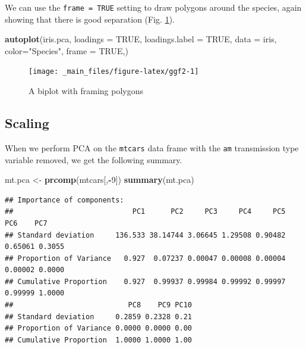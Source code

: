 \documentclass[
]{book}
\newenvironment{Shaded}{\begin{snugshade}}{\end{snugshade}}
\newcommand{\AttributeTok}[1]{\textcolor[rgb]{0.13,0.29,0.53}{#1}}
\newcommand{\ConstantTok}[1]{\textcolor[rgb]{0.56,0.35,0.01}{#1}}
\newcommand{\DecValTok}[1]{\textcolor[rgb]{0.00,0.00,0.81}{#1}}
\newcommand{\FunctionTok}[1]{\textcolor[rgb]{0.13,0.29,0.53}{\textbf{#1}}}
\newcommand{\NormalTok}[1]{#1}
\newcommand{\OtherTok}[1]{\textcolor[rgb]{0.56,0.35,0.01}{#1}}
\newcommand{\SpecialCharTok}[1]{\textcolor[rgb]{0.81,0.36,0.00}{\textbf{#1}}}
\newcommand{\StringTok}[1]{\textcolor[rgb]{0.31,0.60,0.02}{#1}}
\theoremstyle{definition}
\theoremstyle{definition}
\theoremstyle{definition}
\theoremstyle{definition}
\theoremstyle{remark}
\begin{document}
We can use the \texttt{frame\ =\ TRUE} setting to draw polygons around the species, again showing that there is good separation (Fig. \ref{fig:ggf2}).

\begin{Shaded}
\begin{Highlighting}[]
\FunctionTok{autoplot}\NormalTok{(iris.pca, }\AttributeTok{loadings =} \ConstantTok{TRUE}\NormalTok{,}
          \AttributeTok{loadings.label =} \ConstantTok{TRUE}\NormalTok{,}
          \AttributeTok{data =}\NormalTok{ iris,}
          \AttributeTok{color=}\StringTok{"Species"}\NormalTok{,}
          \AttributeTok{frame =} \ConstantTok{TRUE}\NormalTok{,)}
\end{Highlighting}
\end{Shaded}

\begin{figure}

{\centering \texttt{[image: \_main\_files/figure-latex/ggf2-1]} 

}

\caption{A biplot with framing polygons}\label{fig:ggf2}
\end{figure}

\subsection*{Scaling}\label{scaling}

When we perform PCA on the \texttt{mtcars} data frame with the \texttt{am} transmission type variable removed, we get the following summary.

\begin{Shaded}
\begin{Highlighting}[]
\NormalTok{mt.pca }\OtherTok{\textless{}{-}} \FunctionTok{prcomp}\NormalTok{(mtcars[,}\SpecialCharTok{{-}}\DecValTok{9}\NormalTok{])}
\FunctionTok{summary}\NormalTok{(mt.pca)}
\end{Highlighting}
\end{Shaded}

\begin{verbatim}
## Importance of components:
##                            PC1      PC2     PC3     PC4     PC5     PC6    PC7
## Standard deviation     136.533 38.14744 3.06645 1.29508 0.90482 0.65061 0.3055
## Proportion of Variance   0.927  0.07237 0.00047 0.00008 0.00004 0.00002 0.0000
## Cumulative Proportion    0.927  0.99937 0.99984 0.99992 0.99997 0.99999 1.0000
##                           PC8    PC9 PC10
## Standard deviation     0.2859 0.2328 0.21
## Proportion of Variance 0.0000 0.0000 0.00
## Cumulative Proportion  1.0000 1.0000 1.00
\end{verbatim}
\end{document}

